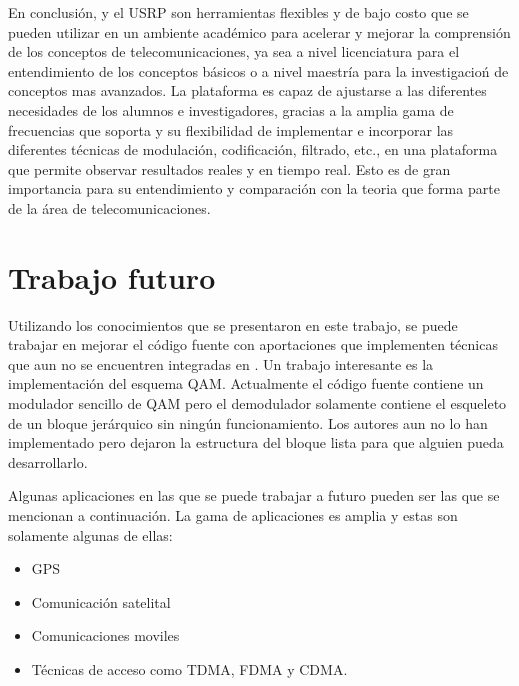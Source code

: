 En conclusi\'on, \gnuradio y el USRP son herramientas flexibles y de bajo costo que se pueden utilizar en un ambiente acad\'emico
para acelerar y mejorar la comprensi\'on de los conceptos de telecomunicaciones, ya sea a nivel licenciatura para el entendimiento
de los conceptos b\'asicos o a nivel maestr\'ia para la investigacio\'n de conceptos mas avanzados. La plataforma es capaz de
ajustarse a las diferentes necesidades de los alumnos e investigadores, gracias a la amplia gama de frecuencias que soporta y su
flexibilidad de implementar e incorporar las diferentes t\'ecnicas de modulaci\'on, codificaci\'on, filtrado, etc., en una
plataforma que permite observar resultados reales y en tiempo real. Esto es de gran importancia para su entendimiento y
comparaci\'on con la teoria que forma parte de la \'area de telecomunicaciones.

\section{Trabajo futuro}
Utilizando los conocimientos que se presentaron en este trabajo, se puede trabajar en mejorar el c\'odigo fuente con aportaciones
que implementen t\'ecnicas que aun no se encuentren integradas en \gnuradio. Un trabajo interesante es la implementaci\'on del
esquema QAM. Actualmente el c\'odigo fuente contiene un modulador sencillo de QAM pero el demodulador solamente contiene el
esqueleto de un bloque jer\'arquico sin ning\'un funcionamiento. Los autores aun no lo han implementado pero dejaron la estructura
del bloque lista para que alguien pueda desarrollarlo.

Algunas aplicaciones en las que se puede trabajar a futuro pueden ser las que se mencionan a continuaci\'on. La gama de
aplicaciones es amplia y estas son solamente algunas de ellas:
\begin{itemize}
  \item GPS
  \item Comunicaci\'on satelital
  \item Comunicaciones moviles
  \item T\'ecnicas de acceso como TDMA, FDMA y CDMA.
\end{itemize}